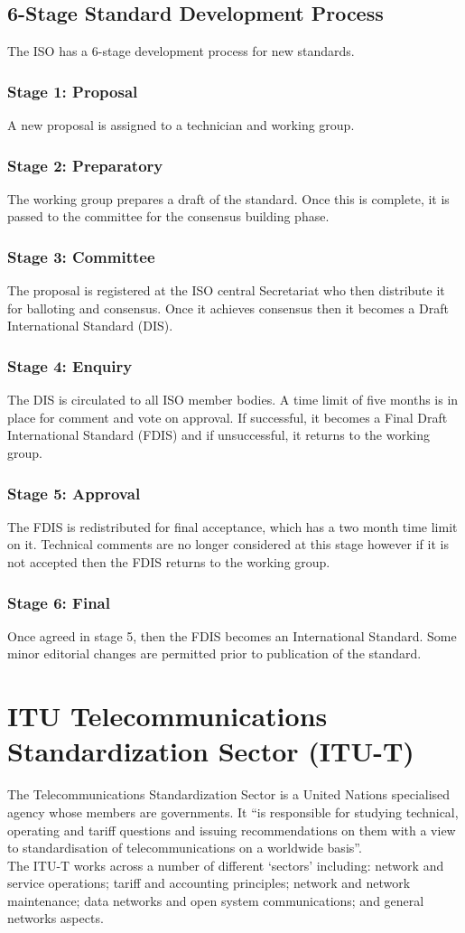 \subsection*{6-Stage Standard Development Process}
The ISO has a 6-stage development process for new standards.
\subsubsection*{Stage 1: Proposal}
A new proposal is assigned to a technician and working group.
\subsubsection*{Stage 2: Preparatory}
The working group prepares a draft of the standard. Once this is complete, it is passed to the committee for the consensus building phase. 
\subsubsection*{Stage 3: Committee}
The proposal is registered at the ISO central Secretariat who then distribute it for balloting and consensus. Once it achieves consensus then it becomes a Draft International Standard (DIS). 
\subsubsection*{Stage 4: Enquiry}
The DIS is circulated to all ISO member bodies. A time limit of five months is in place for comment and vote on approval. If successful, it becomes a Final Draft International Standard (FDIS) and if unsuccessful, it returns to the working group.
\subsubsection*{Stage 5: Approval}
The FDIS is redistributed for final acceptance, which has a two month time limit on it. Technical comments are no longer considered at this stage however if it is not accepted then the FDIS returns to the working group.
\subsubsection*{Stage 6: Final}
Once agreed in stage 5, then the FDIS becomes an International Standard. Some minor editorial changes are permitted prior to publication of the standard.

\section*{ITU Telecommunications Standardization Sector (ITU-T)}
The Telecommunications Standardization Sector is a United Nations specialised agency whose members are governments. It ``is responsible for studying technical, operating and tariff questions and issuing recommendations on them with a view to standardisation of telecommunications on a worldwide basis''.\\
The ITU-T works across a number of different `sectors' including: network and service operations; tariff and accounting principles; network and network maintenance; data networks and open system communications; and general networks aspects.
